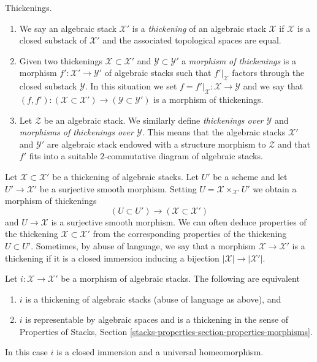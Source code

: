 \begin{definition}
\label{definition-thickening}
Thickenings.
\begin{enumerate}
\item We say an algebraic stack $\mathcal{X}'$ is a {\it thickening}
of an algebraic stack $\mathcal{X}$ if $\mathcal{X}$ is a closed substack
of $\mathcal{X}'$ and the associated topological spaces are equal.
\item Given two thickenings $\mathcal{X} \subset \mathcal{X}'$ and
$\mathcal{Y} \subset \mathcal{Y}'$ a {\it morphism of thickenings}
is a morphism $f' : \mathcal{X}' \to \mathcal{Y}'$ of algebraic stacks
such that $f'|_\mathcal{X}$ factors through the closed
substack $\mathcal{Y}$. In this situation we set
$f = f'|_\mathcal{X} : \mathcal{X} \to \mathcal{Y}$ and we say that
$(f, f') : (\mathcal{X} \subset \mathcal{X}') \to
(\mathcal{Y} \subset \mathcal{Y}')$ is a morphism of thickenings.
\item Let $\mathcal{Z}$ be an algebraic stack. We similarly define
{\it thickenings over $\mathcal{Y}$} and
{\it morphisms of thickenings over $\mathcal{Y}$}.
This means that the algebraic stacks
$\mathcal{X}'$ and $\mathcal{Y}'$
are algebraic stack endowed with a structure
morphism to $\mathcal{Z}$ and that $f'$ fits into a suitable
$2$-commutative diagram of algebraic stacks.
\end{enumerate}
\end{definition}

\noindent
Let $\mathcal{X} \subset \mathcal{X}'$ be a thickening of algebraic stacks.
Let $U'$ be a scheme and let $U' \to \mathcal{X}'$ be a surjective smooth
morphism. Setting $U = \mathcal{X} \times_{\mathcal{X}'} U'$ we obtain
a morphism of thickenings
$$
(U \subset U') \longrightarrow (\mathcal{X} \subset \mathcal{X}')
$$
and $U \to \mathcal{X}$ is a surjective smooth morphism. We can often
deduce properties of the thickening $\mathcal{X} \subset \mathcal{X}'$
from the corresponding properties of the thickening $U \subset U'$.
Sometimes, by abuse of language, we say that a morphism
$\mathcal{X} \to \mathcal{X}'$ is a thickening if it is a closed
immersion inducing a bijection $|\mathcal{X}| \to |\mathcal{X}'|$.

\begin{lemma}
\label{lemma-thickening}
Let $i : \mathcal{X} \to \mathcal{X}'$ be a morphism of algebraic stacks.
The following are equivalent
\begin{enumerate}
\item $i$ is a thickening of algebraic stacks (abuse of language as above), and
\item $i$ is representable by algebraic spaces and
is a thickening in the sense of Properties of Stacks, Section
\ref{stacks-properties-section-properties-morphisms}.
\end{enumerate}
In this case $i$ is a closed immersion and a universal homeomorphism.
\end{lemma}

